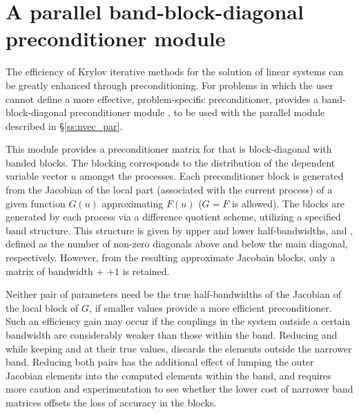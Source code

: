 \section{A parallel band-block-diagonal preconditioner module}
\label{sss:kinbbdpre}
The efficiency of Krylov iterative methods for the solution of linear systems 
can be greatly enhanced through preconditioning. For problems in which the 
user cannot define a more effective, problem-specific preconditioner,
{\kinsol} provides a band-block-diagonal preconditioner module {\kinbbdpre}, 
to be used with the parallel  module described in \S\ref{ss:nvec_par}.

This module provides a preconditioner matrix for {\kinsol} that
is block-diagonal with banded blocks. The blocking corresponds
to the distribution of the dependent variable vector $u$ amongst
the processes. Each preconditioner block is generated from
the Jacobian of the local part (associated with the current
process) of a given function $G(u)$ approximating $F(u)$
($G = F$ is allowed). The blocks are generated by each process via a
difference quotient scheme, utilizing a specified band structure.
This structure is given by upper and lower half-bandwidths, 
and , defined as the number of non-zero diagonals above and
below the main diagonal, respectively.  However, from the resulting
approximate Jacobain blocks, only a matrix of bandwidth  $+$
 $+ 1$ is retained.

Neither pair of parameters need be the true half-bandwidths of the Jacobian
of the local block of $G$, if smaller values provide a more efficient
preconditioner.  Such an efficiency gain may occur if the couplings
in the system outside a certain bandwidth are considerably weaker than
those within the band.  Reducing  and  while keeping
 and  at their true values, discards the elements
outside the narrower band.  Reducing both pairs has the additional
effect of lumping the outer Jacobian elements into the computed elements
within the band, and requires more caution and experimentation to see
whether the lower cost of narrower band matrices offsets the loss of
accuracy in the blocks.


